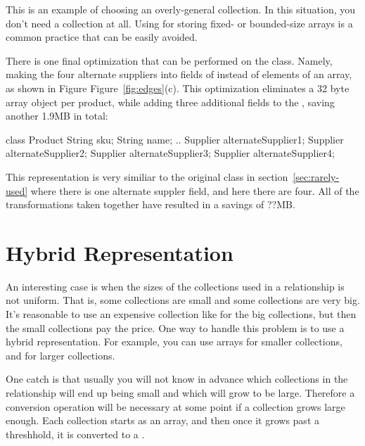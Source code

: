 This is an example of choosing an overly-general collection. In
this situation, you don't need a collection at all. Using 
for storing fixed- or bounded-size arrays is a
common practice that can be easily avoided.

There is one final optimization that can be performed on the 
class. Namely, making the four alternate suppliers into fields of
 instead of elements of an array, as shown in Figure
Figure~\ref{fig:edges}(c). This optimization eliminates a 32 byte
array object per product, while adding three additional fields to the
, saving another 1.9MB in total:
\begin{shortlisting}
class Product {
	String sku;
	String name;
	.. 
	Supplier alternateSupplier1;
	Supplier alternateSupplier2;
	Supplier alternateSupplier3;
	Supplier alternateSupplier4;
}
\end{shortlisting}

This representation is very similiar to the original  class in
section~\ref{sec:rarely-used} where there is one alternate suppler field, and
here there are four. All of the transformations taken
together have resulted in a savings of ??MB.

\section{Hybrid Representation}

An interesting case is when the sizes of the collections used in a relationship
is not uniform. That is, some collections are small and some collections are
very big.  It's reasonable to use an expensive collection like 
for the big collections, but then the small collections pay the price. One way
to handle this problem is to use a hybrid representation. For example, you can
use arrays for smaller collections, and  for larger
collections. 

One catch is that usually you will not know in advance which collections in the
relationship will end up being small and which will grow to be large. Therefore
a conversion operation will be necessary at some point if a collection grows
large enough. Each collection starts as an array, and then once it
grows past a threshhold, it is converted to a .

